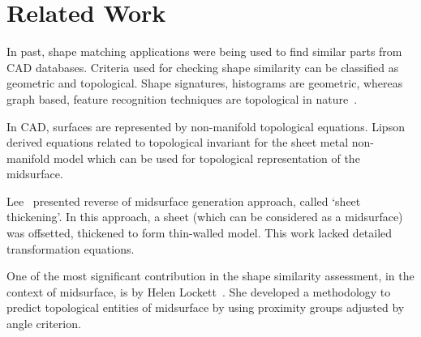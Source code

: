\section{Related Work}

In past, shape matching applications were being used to find similar parts from CAD databases. Criteria used for checking shape similarity can be classified as geometric and topological. Shape signatures, histograms are geometric, whereas graph based, feature recognition techniques are topological in nature~\cite{Lockett2008}.
%

In CAD, surfaces are represented by non-manifold topological equations. Lipson~\cite{Lipson} derived equations related to topological invariant for the sheet metal non-manifold model which can be used for topological representation of the midsurface.

Lee~\cite{SHLee2001} presented reverse of midsurface generation approach, called `sheet thickening'. In this approach, a sheet (which can be considered as a midsurface) was offsetted, thickened to form thin-walled model. This work lacked detailed transformation equations.

One of the most significant contribution in the shape similarity assessment, in the context of midsurface, is by Helen Lockett~\cite{Lockett2008}. She developed a methodology to predict topological entities of midsurface by using proximity groups adjusted by angle criterion.


